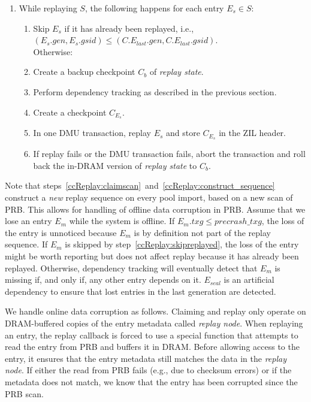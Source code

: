 \documentclass[12pt,a4paper,twoside]{book}
\begin{document}
\begin{enumerate}[noitemsep,beginpenalty=100000,midpenalty=100000]
    \item While replaying $S$, the following happens for each entry $E_s \in S$:
        \begin{enumerate}[noitemsep,beginpenalty=100000,midpenalty=100000]
            \item \label{ccReplay:skipreplayed} Skip $E_s$ if it has already been replayed, i.e., \\
            \mbox{$(E_s.gen, E_s.gsid) \le (C.E_{last}.gen, C.E_{last}.gsid)$}. \\
            Otherwise:
            \item Create a backup checkpoint $C_b$ of \textit{replay state}.
            \item Perform dependency tracking as described in the previous section.
            \item Create a checkpoint $C_{E_s}$.
            \item In one DMU transaction, replay $E_s$ and store $C_{E_s}$ in the ZIL header.
            \item If replay fails or the DMU transaction fails, abort the transaction and roll back the in-DRAM version of \textit{replay state} to $C_b$.
    \end{enumerate}
\end{enumerate}

Note that steps~\ref{ccReplay:claimscan}~and~\ref{ccReplay:construct_sequence} construct a \textit{new} replay sequence on every pool import, based on a new scan of PRB.
This allows for handling of offline data corruption in PRB.
Assume that we lose an entry $E_m$ while the system is offline.
If \mbox{$E_m.txg \le precrash\_txg$}, the loss of the entry is unnoticed because $E_m$ is by definition not part of the replay sequence.
If $E_m$ is skipped by step~\ref{ccReplay:skipreplayed}, the loss of the entry might be worth reporting but does not affect replay because it has already been replayed.
Otherwise, dependency tracking will eventually detect that $E_m$ is missing if, and only if, any other entry depends on it.
$E_{seal}$ is an artificial dependency to ensure that lost entries in the last generation are detected.

We handle online data corruption as follows.
Claiming and replay only operate on DRAM-buffered copies of the entry metadata called \textit{replay node}.
When replaying an entry, the replay callback is forced to use a special function that attempts to read the entry from PRB and buffers it in DRAM.
Before allowing access to the entry, it ensures that the entry metadata still matches the data in the \textit{replay node}.
If either the read from PRB fails (e.g., due to checksum errors) or if the metadata does not match, we know that the entry has been corrupted since the PRB scan.
\end{document}
